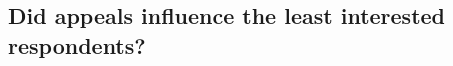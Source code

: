 \documentclass[12pt]{article}
\newcommand{\todo}[1]{\textit{\textcolor{red}{$<$todo$>$ #1 $<$/todo$>$}}}
\newcommand{\figurepath}[1]{../output/figures/#1}
\begin{document}







\subsection{Did appeals influence the least interested respondents?}
\end{document}

